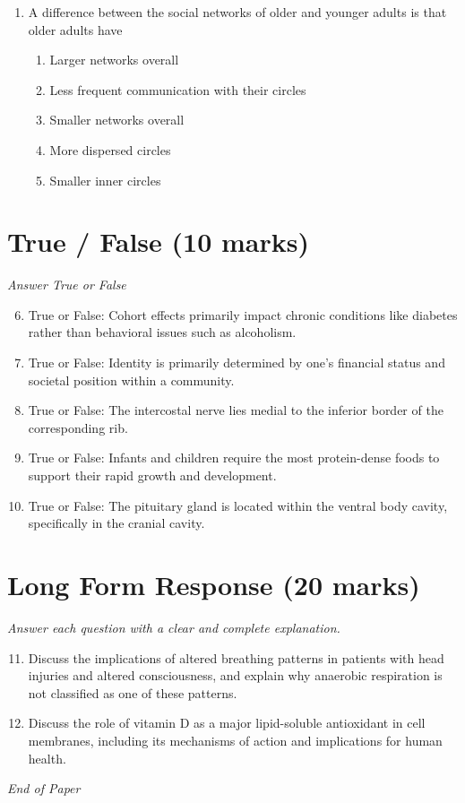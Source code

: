 \documentclass[12pt]{article}
\begin{document}
\begin{enumerate}[label=\arabic*.]
\begin{enumerate}[label=(\alph*)]
    \item Alpha-L-iduronidase
    \item Arylsulfatase A
    \item Hexosaminidase B
    \item Glucose-6-phosphatase
    \item Lysosomal alpha-glucosidase
\end{enumerate}
\item A difference between the social networks of older and younger adults is that older adults have
\begin{enumerate}[label=(\alph*)]
    \item Larger networks overall
    \item Less frequent communication with their circles
    \item Smaller networks overall
    \item More dispersed circles
    \item Smaller inner circles
\end{enumerate}
\end{enumerate}

\section*{True / False (10 marks)}
\textit{Answer True or False}
\begin{enumerate}[label=\arabic*.]
\setcounter{enumi}{5}
\item True or False: Cohort effects primarily impact chronic conditions like diabetes rather than behavioral issues such as alcoholism.
\item True or False: Identity is primarily determined by one's financial status and societal position within a community.
\item True or False: The intercostal nerve lies medial to the inferior border of the corresponding rib.
\item True or False: Infants and children require the most protein-dense foods to support their rapid growth and development.
\item True or False: The pituitary gland is located within the ventral body cavity, specifically in the cranial cavity.
\end{enumerate}

\section*{Long Form Response (20 marks)}
\textit{Answer each question with a clear and complete explanation.}
\begin{enumerate}[label=\arabic*.]
\setcounter{enumi}{10}
\item Discuss the implications of altered breathing patterns in patients with head injuries and altered consciousness, and explain why anaerobic respiration is not classified as one of these patterns.
\item Discuss the role of vitamin D as a major lipid-soluble antioxidant in cell membranes, including its mechanisms of action and implications for human health.
\end{enumerate}

\vfill
\noindent\textit{End of Paper}
\end{document}
